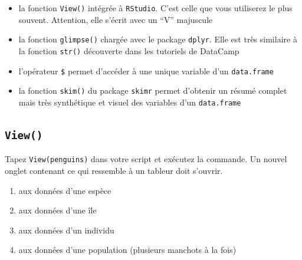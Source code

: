 \documentclass[
  letterpaper,
  DIV=11,
  numbers=noendperiod]{scrreprt}
\providecommand{\tightlist}{%
  \setlength{\itemsep}{0pt}\setlength{\parskip}{0pt}}\usepackage{longtable,booktabs,array}
\begin{document}
\begin{itemize}
\tightlist
\item
  la fonction \texttt{View()} intégrée à \texttt{RStudio}. C'est celle
  que vous utiliserez le plus souvent. Attention, elle s'écrit avec un
  ``V'' majuscule
\item
  la fonction \texttt{glimpse()} chargée avec le package \texttt{dplyr}.
  Elle est très similaire à la fonction \texttt{str()} découverte dans
  les tutoriels de DataCamp
\item
  l'opérateur \texttt{\$} permet d'accéder à une unique variable d'un
  \texttt{data.frame}
\item
  la fonction \texttt{skim()} du package \texttt{skimr} permet d'obtenir
  un résumé complet mais très synthétique et visuel des variables d'un
  \texttt{data.frame}
\end{itemize}

\hypertarget{sec-View}{%
\subsection{\texorpdfstring{\texttt{View()}}{View()}}\label{sec-View}}

Tapez \texttt{View(penguins)} dans votre script et exécutez la commande.
Un nouvel onglet contenant ce qui ressemble à un tableur doit s'ouvrir.

\begin{tcolorbox}[enhanced jigsaw, bottomtitle=1mm, title=\textcolor{quarto-callout-tip-color}{\faLightbulb}\hspace{0.5em}{Quizz : à quoi correspondent chacune des lignes de ce tableau ?}, breakable, opacitybacktitle=0.6, coltitle=black, opacityback=0, toprule=.15mm, toptitle=1mm, titlerule=0mm, colback=white, rightrule=.15mm, arc=.35mm, leftrule=.75mm, bottomrule=.15mm, left=2mm, colframe=quarto-callout-tip-color-frame, colbacktitle=quarto-callout-tip-color!10!white]

\begin{enumerate}
\def\labelenumi{\alph{enumi}.}
\tightlist
\item
  aux données d'une espèce
\item
  aux données d'une île
\item
  aux données d'un individu
\item
  aux données d'une population (plusieurs manchots à la fois)
\end{enumerate}

\end{tcolorbox}
\end{document}
